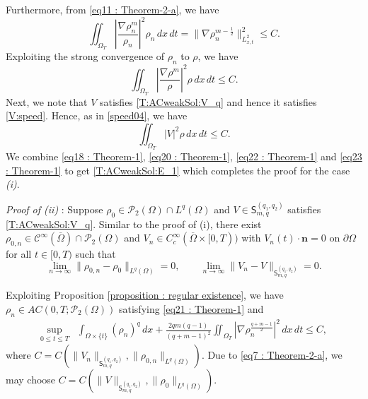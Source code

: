 \documentclass{amsart}
\numberwithin{equation}{section}
\newcommand{\calC}{{ \mathcal C  }}
\begin{document}
Furthermore, from \eqref{eq11 : Theorem-2-a}, we have 
$$ \iint_{\Omega_T}  \left | \frac{\nabla \rho_n^m}{\rho_n}\right |^{2} \rho_n \,dx\,dt =\|\nabla \rho_n^{m-\frac{1}{2}}\|^2_{L^2_{x,t}} \leq C.$$ 
Exploiting the strong convergence of $\rho_n$ to $\rho$, we have 
\begin{equation}\label{eq22 : Theorem-1}
 \iint_{\Omega_T} \left | \frac{\nabla \rho^m}{\rho}\right |^{2} \rho \,dx\,dt  \leq C.
\end{equation}\label{eq23 : Theorem-1}
Next, we note that $V$ satisfies \eqref{T:ACweakSol:V_q} and hence it satisfies \eqref{V:speed}. Hence, as in \eqref{speed04}, we have 
\begin{equation*}
 \iint_{\Omega_T} |V|^{2}\rho \,dx\,dt  \leq C.
\end{equation*}
We combine \eqref{eq18 : Theorem-1}, \eqref{eq20 : Theorem-1}, \eqref{eq22 : Theorem-1} and \eqref{eq23 : Theorem-1} to get \eqref{T:ACweakSol:E_1} which completes the proof for the case {\it (i)}.
%


{\it Proof of (ii)} :
Suppose $\rho_0\in  \mathcal{P}_2(\Omega) \cap L^{q}(\Omega)$ and $V \in  \mathsf{S}_{m,q}^{(q_1,q_2)} $ satisfies  \eqref{T:ACweakSol:V_q}.
Similar to the proof of (i), there exist  $\rho_{0,n}\in \calC^\infty(\overline{\Omega})\cap \mathcal{P}_2(\Omega)$ and  $V_n\in C^\infty_c(\overline{\Omega}\times[0,T)) $ with $V_n(t)\cdot \mathbf{n}=0$ on $\partial\Omega$ for all $t\in[0,T)$ such that
\begin{equation}\label{eq7 : Theorem-2-a}
\lim_{n \rightarrow \infty}\|\rho_{0,n} - \rho_0 \|_{L^q(\Omega)} =0, \qquad \lim_{n \rightarrow \infty}\|V_n - V \|_{\mathsf{S}_{m,q}^{(q_1,q_2)} } =0.
\end{equation}

Exploiting Proposition \ref{proposition : regular existence},  we have $\rho_n\in AC(0,T; \mathcal{P}_2(\Omega))$  satisfying \eqref{eq21 : Theorem-1} and
\begin{equation*}
\begin{aligned}
\sup_{0\leq t \leq T} &\int_{\Omega\times \{t\}}  (\rho_n)^q   \,dx
 + \frac{2qm(q-1)}{(q+m-1)^2} \iint_{\Omega_T} \left |\nabla \rho_n^{\frac{q+m-1}{2}}\right |^2  \,dx\,dt \leq C,
\end{aligned}
\end{equation*}
where $C= C( \|V_n\|_{\mathsf{S}_{m, q}^{(q_1,q_2)}}, \|\rho_{0,n}\|_{L^q(\Omega)} )$.
Due to \eqref{eq7 : Theorem-2-a}, we may choose
$C= C( \|V\|_{\mathsf{S}_{m, q}^{(q_1,q_2)}}, \|\rho_{0}\|_{L^q(\Omega)} )$.
\end{document}
